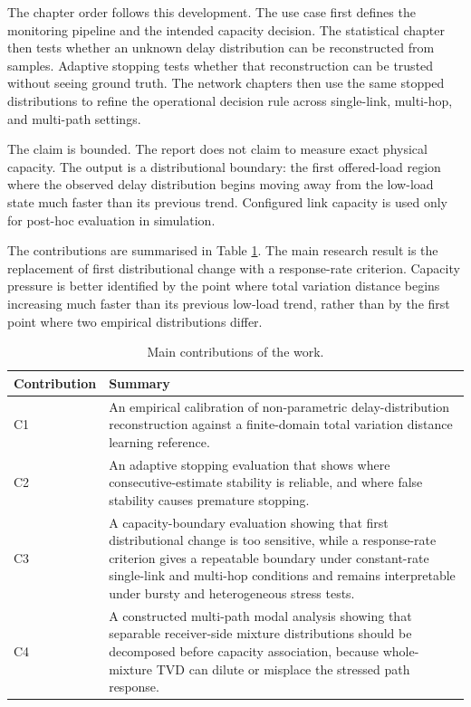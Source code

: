 The chapter order follows this development. The use case first defines the monitoring pipeline and the intended capacity decision. The statistical chapter then tests whether an unknown delay distribution can be reconstructed from samples. Adaptive stopping tests whether that reconstruction can be trusted without seeing ground truth. The network chapters then use the same stopped distributions to refine the operational decision rule across single-link, multi-hop, and multi-path settings.

The claim is bounded. The report does not claim to measure exact physical capacity. The output is a distributional boundary: the first offered-load region where the observed delay distribution begins moving away from the low-load state much faster than its previous trend. Configured link capacity is used only for post-hoc evaluation in simulation.

The contributions are summarised in Table \ref{tab:intro-contributions}. The main research result is the replacement of first distributional change with a response-rate criterion. Capacity pressure is better identified by the point where total variation distance begins increasing much faster than its previous low-load trend, rather than by the first point where two empirical distributions differ.

\begin{table}[htbp]
\centering
\small
\begin{tabular}{p{}p{}}
\toprule
Contribution & Summary \\
\midrule
C1 & An empirical calibration of non-parametric delay-distribution reconstruction against a finite-domain total variation distance learning reference. \\
C2 & An adaptive stopping evaluation that shows where consecutive-estimate stability is reliable, and where false stability causes premature stopping. \\
C3 & A capacity-boundary evaluation showing that first distributional change is too sensitive, while a response-rate criterion gives a repeatable boundary under constant-rate single-link and multi-hop conditions and remains interpretable under bursty and heterogeneous stress tests. \\
C4 & A constructed multi-path modal analysis showing that separable receiver-side mixture distributions should be decomposed before capacity association, because whole-mixture TVD can dilute or misplace the stressed path response. \\
\bottomrule
\end{tabular}
\caption{Main contributions of the work.}
\label{tab:intro-contributions}
\end{table}

